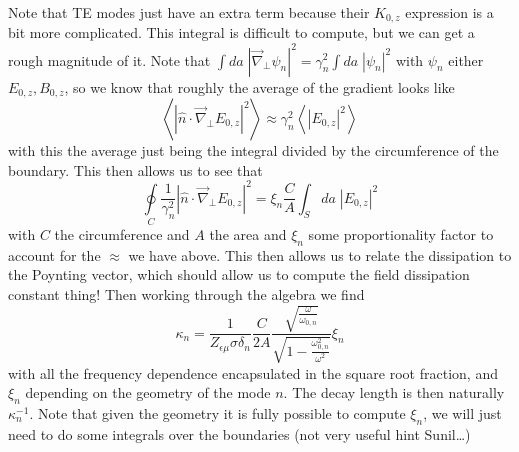 \documentclass[10pt]{report}
\newcommand{\expvalue}[1]{\left<#1\right>}
\newcommand{\abs}[1]{\left|#1\right|}
\begin{document}
Note that TE modes just have an extra term because their $K_{0,z}$ expression is a bit more complicated. This integral is difficult to compute, but we can get a rough magnitude of it. Note that $\int da\; \abs{\vec{\nabla}_{\perp}\psi_n}^2 = \gamma_n^2 \int da\; \abs{\psi_n}^2$ with $\psi_n$ either $E_{0,z}, B_{0,z}$, so we know that roughly the average of the gradient looks like
\begin{equation}
    \expvalue{\abs{\hat{n} \cdot \vec{\nabla}_{\perp}E_{0,z}}^2} \approx \gamma_n^2\expvalue{\abs{E_{0,z}}^2}
\end{equation}
with this the average just being the integral divided by the circumference of the boundary. This then allows us to see that
\begin{equation}
    \oint\limits_C \frac{1}{\gamma_n^2}\abs{\hat{n} \cdot \vec{\nabla}_{\perp}E_{0,z}}^2 = \xi_n \frac{C}{A}\int_S da\; \abs{E_{0,z}}^2
\end{equation}
with $C$ the circumference and $A$ the area and $\xi_n$ some proportionality factor to account for the $\approx$ we have above. This then allows us to relate the dissipation to the Poynting vector, which should allow us to compute the field dissipation constant thing! Then working through the algebra we find
\begin{equation}
    \kappa_n = \frac{1}{Z_{\epsilon \mu}\sigma \delta_n}\frac{C}{2A}\frac{\sqrt{\frac{\omega}{\omega_{0,n}}}}{\sqrt{1 - \frac{\omega_{0,n}^2}{\omega^2}}}\xi_n
\end{equation}
with all the frequency dependence encapsulated in the square root fraction, and $\xi_n$ depending on the geometry of the mode $n$. The decay length is then naturally $\kappa_n^{-1}$. Note that given the geometry it is fully possible to compute $\xi_n$, we will just need to do some integrals over the boundaries (not very useful hint Sunil\dots)
\end{document}
